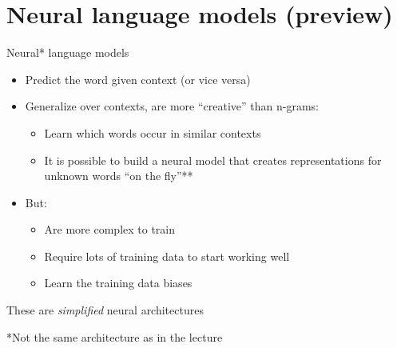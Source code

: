 \documentclass{beamer}
\begin{document}
\section{Neural language models (preview)}
\begin{frame}{Neural* language models}
\begin{itemize}
    \item Predict the word given context (or vice versa)
    \item Generalize over contexts, are more ``creative'' than n-grams:
    \begin{itemize}
        \item Learn which words occur in similar contexts
        \item It is possible to build a neural model that creates representations for unknown words ``on the fly''**
    \end{itemize}
    \item But:
    \begin{itemize}
        \item Are more complex to train
        \item Require lots of training data to start working well
        \item Learn the training data biases
    \end{itemize}
\end{itemize}

\vspace{1cm}

{\small *These are {\it simplified} neural architectures}

{\small **Not the same architecture as in the lecture}
\end{frame}
\end{document}
